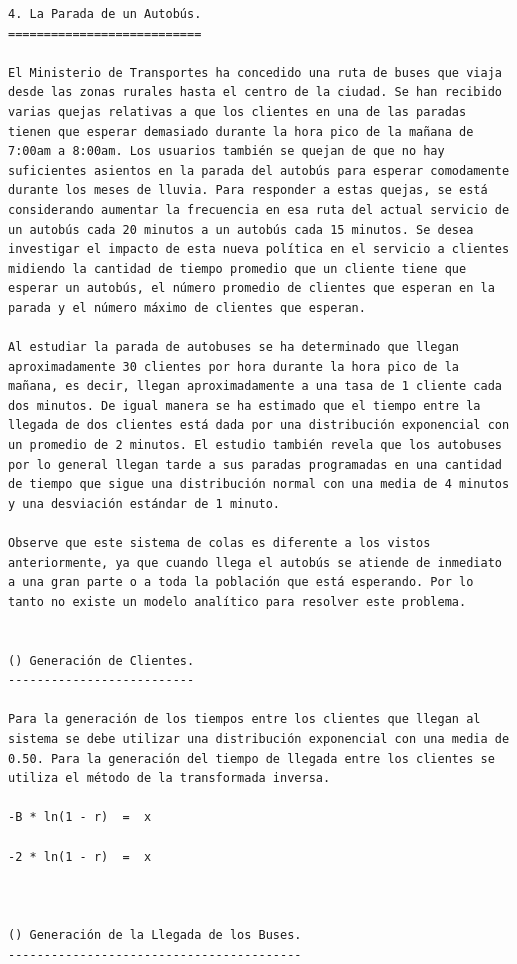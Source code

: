 \begin{verbatim}
4. La Parada de un Autobús.
===========================

El Ministerio de Transportes ha concedido una ruta de buses que viaja desde las zonas rurales hasta el centro de la ciudad. Se han recibido varias quejas relativas a que los clientes en una de las paradas tienen que esperar demasiado durante la hora pico de la mañana de 7:00am a 8:00am. Los usuarios también se quejan de que no hay suficientes asientos en la parada del autobús para esperar comodamente durante los meses de lluvia. Para responder a estas quejas, se está considerando aumentar la frecuencia en esa ruta del actual servicio de un autobús cada 20 minutos a un autobús cada 15 minutos. Se desea investigar el impacto de esta nueva política en el servicio a clientes midiendo la cantidad de tiempo promedio que un cliente tiene que esperar un autobús, el número promedio de clientes que esperan en la parada y el número máximo de clientes que esperan.

Al estudiar la parada de autobuses se ha determinado que llegan aproximadamente 30 clientes por hora durante la hora pico de la mañana, es decir, llegan aproximadamente a una tasa de 1 cliente cada dos minutos. De igual manera se ha estimado que el tiempo entre la llegada de dos clientes está dada por una distribución exponencial con un promedio de 2 minutos. El estudio también revela que los autobuses por lo general llegan tarde a sus paradas programadas en una cantidad de tiempo que sigue una distribución normal con una media de 4 minutos y una desviación estándar de 1 minuto.

Observe que este sistema de colas es diferente a los vistos anteriormente, ya que cuando llega el autobús se atiende de inmediato a una gran parte o a toda la población que está esperando. Por lo tanto no existe un modelo analítico para resolver este problema.


() Generación de Clientes.
--------------------------

Para la generación de los tiempos entre los clientes que llegan al sistema se debe utilizar una distribución exponencial con una media de 0.50. Para la generación del tiempo de llegada entre los clientes se utiliza el método de la transformada inversa.

-B * ln(1 - r)  =  x

-2 * ln(1 - r)  =  x



() Generación de la Llegada de los Buses.
-----------------------------------------


\end{verbatim}
